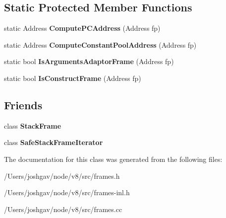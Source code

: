 \subsection*{Static Protected Member Functions}
\begin{DoxyCompactItemize}
\item 
static Address {\bfseries Compute\+P\+C\+Address} (Address fp)\hypertarget{classv8_1_1internal_1_1_standard_frame_aeff1e57ce047c0318f1f8260c9680c7b}{}\label{classv8_1_1internal_1_1_standard_frame_aeff1e57ce047c0318f1f8260c9680c7b}

\item 
static Address {\bfseries Compute\+Constant\+Pool\+Address} (Address fp)\hypertarget{classv8_1_1internal_1_1_standard_frame_a3f8156bbb0acef720b9123a7c0e34bfc}{}\label{classv8_1_1internal_1_1_standard_frame_a3f8156bbb0acef720b9123a7c0e34bfc}

\item 
static bool {\bfseries Is\+Arguments\+Adaptor\+Frame} (Address fp)\hypertarget{classv8_1_1internal_1_1_standard_frame_a43bc4f67c3fdff50657cc93e0d83f0a4}{}\label{classv8_1_1internal_1_1_standard_frame_a43bc4f67c3fdff50657cc93e0d83f0a4}

\item 
static bool {\bfseries Is\+Construct\+Frame} (Address fp)\hypertarget{classv8_1_1internal_1_1_standard_frame_afc0b10707c929797c6e3448714e73bbf}{}\label{classv8_1_1internal_1_1_standard_frame_afc0b10707c929797c6e3448714e73bbf}

\end{DoxyCompactItemize}
\subsection*{Friends}
\begin{DoxyCompactItemize}
\item 
class {\bfseries Stack\+Frame}\hypertarget{classv8_1_1internal_1_1_standard_frame_a97d8ed08ddcf9dcc973f7e29b74a992f}{}\label{classv8_1_1internal_1_1_standard_frame_a97d8ed08ddcf9dcc973f7e29b74a992f}

\item 
class {\bfseries Safe\+Stack\+Frame\+Iterator}\hypertarget{classv8_1_1internal_1_1_standard_frame_aa1c3e6274807549ee11be5be6cd1ae62}{}\label{classv8_1_1internal_1_1_standard_frame_aa1c3e6274807549ee11be5be6cd1ae62}

\end{DoxyCompactItemize}


The documentation for this class was generated from the following files\+:\begin{DoxyCompactItemize}
\item 
/\+Users/joshgav/node/v8/src/frames.\+h\item 
/\+Users/joshgav/node/v8/src/frames-\/inl.\+h\item 
/\+Users/joshgav/node/v8/src/frames.\+cc\end{DoxyCompactItemize}

